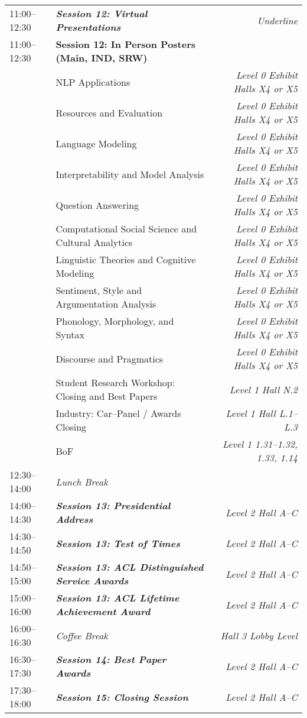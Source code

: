 \begin{xltabular}{\linewidth}{l X r}
    11:00--12:30    &   \textit{\textbf{Session 12: Virtual Presentations}}    & \textit{Underline}  \\
    11:00--12:30    &   \textbf{Session 12: In Person Posters (Main, IND, SRW)} & \\
    &   NLP Applications  & \textit{Level 0 Exhibit Halls X4 or X5} \\
    &   Resources and Evaluation  & \textit{Level 0 Exhibit Halls X4 or X5} \\
    &   Language Modeling  & \textit{Level 0 Exhibit Halls X4 or X5} \\
    &   Interpretability and Model Analysis   & \textit{Level 0 Exhibit Halls X4 or X5} \\
    &   Question Answering  & \textit{Level 0 Exhibit Halls X4 or X5} \\
    &   Computational Social Science and Cultural Analytics   & \textit{Level 0 Exhibit Halls X4 or X5} \\
    &   Linguistic Theories and Cognitive Modeling & \textit{Level 0 Exhibit Halls X4 or X5} \\
    &   Sentiment, Style and Argumentation Analysis   & \textit{Level 0 Exhibit Halls X4 or X5} \\
    &   Phonology, Morphology, and Syntax   & \textit{Level 0 Exhibit Halls X4 or X5} \\
    &   Discourse and Pragmatics   & \textit{Level 0 Exhibit Halls X4 or X5} \\
    &   Student Research Workshop: Closing and Best Papers  & \textit{Level 1 Hall N.2} \\
    &   Industry: Car--Panel / Awards Closing  & \textit{Level 1 Hall L.1--L.3} \\
    &   BoF  & \textit{Level 1 1.31--1.32, 1.33, 1.14} \\

    12:30--14:00    &   \textit{Lunch Break}  & \\

    14:00--14:30    &   \textit{\textbf{Session 13: Presidential Address}}  & \textit{Level 2 Hall A--C}\\
    14:30--14:50    &   \textit{\textbf{Session 13: Test of Times}}  & \textit{Level 2 Hall A--C}\\
    14:50--15:00    &   \textit{\textbf{Session 13: ACL Distinguished Service Awards}}  & \textit{Level 2 Hall A--C}\\
    15:00--16:00    &   \textit{\textbf{Session 13: ACL Lifetime Achievement Award}}  & \textit{Level 2 Hall A--C}\\

    16:00--16:30    &   \textit{Coffee Break}    & \textit{Hall 3 Lobby Level }  \\

    16:30--17:30    &   \textit{\textbf{Session 14: Best Paper Awards}}  & \textit{Level 2 Hall A--C}\\
    
    17:30--18:00    &   \textit{\textbf{Session 15: Closing Session}}  & \textit{Level 2 Hall A--C}\\


\end{xltabular}




\endgroup
